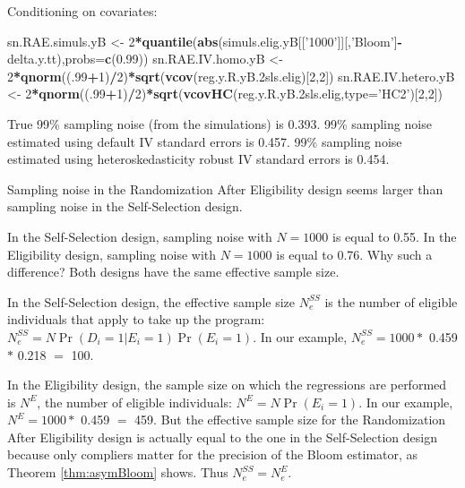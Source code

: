 \documentclass[]{book}
\newenvironment{Shaded}{\begin{snugshade}}{\end{snugshade}}
\newcommand{\DataTypeTok}[1]{\textcolor[rgb]{0.13,0.29,0.53}{#1}}
\newcommand{\DecValTok}[1]{\textcolor[rgb]{0.00,0.00,0.81}{#1}}
\newcommand{\FloatTok}[1]{\textcolor[rgb]{0.00,0.00,0.81}{#1}}
\newcommand{\KeywordTok}[1]{\textcolor[rgb]{0.13,0.29,0.53}{\textbf{#1}}}
\newcommand{\NormalTok}[1]{#1}
\newcommand{\OperatorTok}[1]{\textcolor[rgb]{0.81,0.36,0.00}{\textbf{#1}}}
\newcommand{\StringTok}[1]{\textcolor[rgb]{0.31,0.60,0.02}{#1}}
\theoremstyle{definition}
\theoremstyle{definition}
\theoremstyle{definition}
\theoremstyle{remark}
\let\BeginKnitrBlock\begin \let\EndKnitrBlock\end
\begin{document}
Conditioning on covariates:

\begin{Shaded}
\begin{Highlighting}[]
\NormalTok{sn.RAE.simuls.yB <-}\StringTok{ }\DecValTok{2}\OperatorTok{*}\KeywordTok{quantile}\NormalTok{(}\KeywordTok{abs}\NormalTok{(simuls.elig.yB[[}\StringTok{'1000'}\NormalTok{]][,}\StringTok{'Bloom'}\NormalTok{]}\OperatorTok{-}\NormalTok{delta.y.tt),}\DataTypeTok{probs=}\KeywordTok{c}\NormalTok{(}\FloatTok{0.99}\NormalTok{))}
\NormalTok{sn.RAE.IV.homo.yB <-}\StringTok{ }\DecValTok{2}\OperatorTok{*}\KeywordTok{qnorm}\NormalTok{((.}\DecValTok{99}\OperatorTok{+}\DecValTok{1}\NormalTok{)}\OperatorTok{/}\DecValTok{2}\NormalTok{)}\OperatorTok{*}\KeywordTok{sqrt}\NormalTok{(}\KeywordTok{vcov}\NormalTok{(reg.y.R.yB}\FloatTok{.2}\NormalTok{sls.elig)[}\DecValTok{2}\NormalTok{,}\DecValTok{2}\NormalTok{])}
\NormalTok{sn.RAE.IV.hetero.yB <-}\StringTok{ }\DecValTok{2}\OperatorTok{*}\KeywordTok{qnorm}\NormalTok{((.}\DecValTok{99}\OperatorTok{+}\DecValTok{1}\NormalTok{)}\OperatorTok{/}\DecValTok{2}\NormalTok{)}\OperatorTok{*}\KeywordTok{sqrt}\NormalTok{(}\KeywordTok{vcovHC}\NormalTok{(reg.y.R.yB}\FloatTok{.2}\NormalTok{sls.elig,}\DataTypeTok{type=}\StringTok{'HC2'}\NormalTok{)[}\DecValTok{2}\NormalTok{,}\DecValTok{2}\NormalTok{])}
\end{Highlighting}
\end{Shaded}

True 99\% sampling noise (from the simulations) is 0.393.
99\% sampling noise estimated using default IV standard errors is 0.457.
99\% sampling noise estimated using heteroskedasticity robust IV standard errors is 0.454.

\BeginKnitrBlock{remark}
\iffalse{} {Remark. } \fi{}Sampling noise in the Randomization After Eligibility design seems larger than sampling noise in the Self-Selection design.
\EndKnitrBlock{remark}

In the Self-Selection design, sampling noise with \(N=1000\) is equal to 0.55.
In the Eligibility design, sampling noise with \(N=1000\) is equal to 0.76.
Why such a difference?
Both designs have the same effective sample size.

In the Self-Selection design, the effective sample size \(N^{SS}_e\) is the number of eligible individuals that apply to take up the program: \(N^{SS}_e=N\Pr(D_i=1|E_i=1)\Pr(E_i=1)\).
In our example, \(N^{SS}_e=1000 *\) 0.459 \(*\) 0.218 \(=\) 100.

In the Eligibility design, the sample size on which the regressions are performed is \(N^{E}\), the number of eligible individuals: \(N^{E}=N\Pr(E_i=1)\).
In our example, \(N^{E}=1000 *\) 0.459 \(=\) 459.
But the effective sample size for the Randomization After Eligibility design is actually equal to the one in the Self-Selection design because only compliers matter for the precision of the Bloom estimator, as Theorem \ref{thm:asymBloom} shows.
Thus \(N^{SS}_e=N^{E}_e\).
\end{document}
